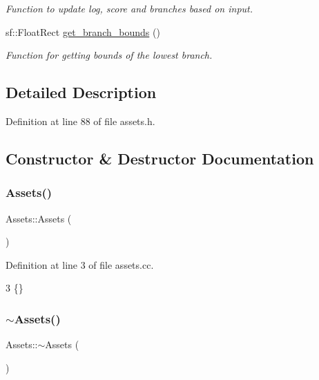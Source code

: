 \begin{DoxyCompactItemize}
\begin{DoxyCompactList}\small\item\em Function to update log, score and branches based on input. \end{DoxyCompactList}\item 
sf\+::\+Float\+Rect \hyperlink{class_assets_aac229701c6bc1d67c56a1e607658d923}{get\+\_\+branch\+\_\+bounds} ()
\begin{DoxyCompactList}\small\item\em Function for getting bounds of the lowest branch. \end{DoxyCompactList}\end{DoxyCompactItemize}


\subsection{Detailed Description}


Definition at line 88 of file assets.\+h.



\subsection{Constructor \& Destructor Documentation}
\mbox{\label{class_assets_a552bf7f55194d9a4469ccc38c6938142}} 
\subsubsection{\texorpdfstring{Assets()}{Assets()}}
{\footnotesize\ttfamily Assets\+::\+Assets (\begin{DoxyParamCaption}{ }\end{DoxyParamCaption})}



Definition at line 3 of file assets.\+cc.


\begin{DoxyCode}
3 \{\}
\end{DoxyCode}
\mbox{\label{class_assets_ae47d41f4f674807c271f64ffc1771b7f}} 
\subsubsection{\texorpdfstring{$\sim$\+Assets()}{~Assets()}}
{\footnotesize\ttfamily Assets\+::$\sim$\+Assets (\begin{DoxyParamCaption}{ }\end{DoxyParamCaption})}



